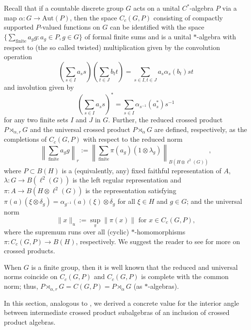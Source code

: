 \documentclass[a4]{amsart}
\numberwithin{equation}{section}
\begin{document}
Recall that if a countable discrete group $G$ acts on a unital
$C^*$-algebra $P$ via a map $\alpha: G \to \mathrm{Aut}(P)$, then the
space $C_c(G,P)$ consisting of compactly supported $P$-valued
functions on $G$ can be identified with the space $ \{
\sum_{\text{finite}}a_g g: a_g \in P, g \in G\}$ of formal finite sums
and is a unital $*$-algebra with respect to (the so called twisted)
multiplication given by the convolution operation
       \[
\left(\sum_{s\in I} a_s s\right) \left(\sum_{t\in J}
       b_t t\right) = \sum_{s \in I, t\in J} a_s \alpha_s(b_t)st
       \]
            and involution given by
       \[
\left(\sum_{s\in I} a_s s\right)^*=\sum_{s\in I} \alpha_{s^{-1}}(a_s^*)s^{-1} 
       \]
  for any two finite sets $I$ and $J$ in $G$. Further, the reduced crossed
  product $P \rtimes_{\alpha, r} G$ and the universal crossed product
  $P \rtimes_{\alpha} G$ are defined, respectively, as the completions
  of $C_c(G,P)$ with respect to the reduced norm
  \[
  \left \| \sum_{\text{finite}} a_g g \right \|_r:=\left \| \sum_{\text{finite}}\pi(a_g) (1 \otimes \lambda_g) \right \|_{B(H \otimes \ell^2(G))},
  \]
where $P \subset B(H)$ is a (equivalently, any) fixed faithful
representation of $A$, $\lambda: G \to B(\ell^2(G))$ is the left
regular representation and $\pi: A \to B(H\otimes \ell^2(G))$ is the
representation satisfying $\pi(a)(\xi \otimes \delta_g) =
\alpha_{g^{-1}}(a)(\xi) \otimes \delta_g$ for all $\xi \in H$ and $g
\in G$; and the universal norm
\[
\| x  \|_u:= \sup_\pi
\|\pi(x)\|\text { for } x \in C_c(G, P),
\]
where the supremum runs over all (cyclic) $*$-homomorphisms
  $\pi: C_c(G,P) \to B(H)$, respectively. We suggest the reader to see \cite{BO, wil} for more on crossed products.

  
When $G$ is a finite group, then it is well known that the  reduced and universal norms coincide on $C_c(G,P)$ and $C_c(G,P)$
is complete with the common norm; thus, 
$P\rtimes_{\alpha, r} G = C(G,P) = P\rtimes_{\alpha} G$ (as $*$-algebras).
  
  In this section, analogous to \cite[Proposition 2.7]{BG1}, we
  derived a concrete value for the interior angle between intermediate
  crossed product subalgebras of an inclusion of crossed product
  algebras. 
\end{document}

